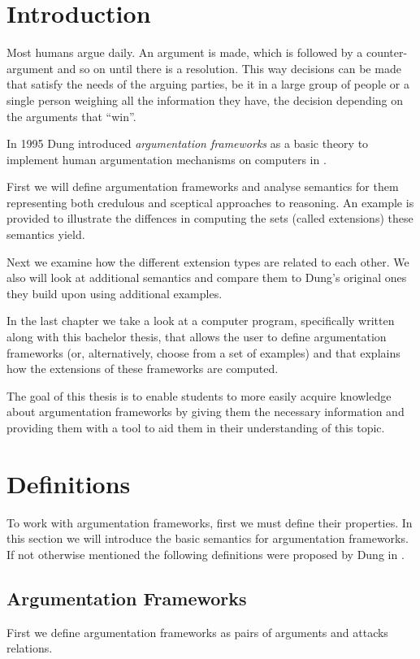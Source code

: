 \documentclass[draft,final]{vutinfth} %
\newcommand{\hl}{\par\vspace{6pt}} %
\newcommand{\cl}{\par\vspace{12pt}} %
\begin{document}
\chapter{Introduction}
Most humans argue daily. An argument is made, which is followed by a counter-argument and so on until there is a resolution. This way decisions can be made that satisfy the needs of the arguing parties, be it in a large group of people or a single person weighing all the information they have, the decision depending on the arguments that ``win''.\hl
In 1995 Dung introduced \emph{argumentation frameworks} as a basic theory to implement human argumentation mechanisms on computers in \cite{Dung}.\cl
First we will define argumentation frameworks and analyse semantics for them representing both credulous and sceptical approaches to reasoning. An example is provided to illustrate the diffences in computing the sets (called extensions) these semantics yield.\hl
Next we examine how the different extension types are related to each other. We also will look at additional semantics and compare them to Dung's original ones they build upon using additional examples.\hl
In the last chapter we take a look at a computer program, specifically written along with this bachelor thesis, that allows the user to define argumentation frameworks (or, alternatively, choose from a set of examples) and that explains how the extensions of these frameworks are computed.\cl
The goal of this thesis is to enable students to more easily acquire knowledge about argumentation frameworks by giving them the necessary information and providing them with a tool to aid them in their understanding of this topic.

\chapter{Definitions}

To work with argumentation frameworks, first we must define their properties. In this section we will introduce the basic semantics for argumentation frameworks. If not otherwise mentioned the following definitions were proposed by Dung in \cite{Dung}.\cl

\section{Argumentation Frameworks}

First we define argumentation frameworks as pairs of arguments and attacks relations.\hl
\end{document}
